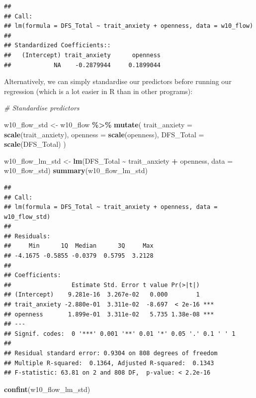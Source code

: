 \documentclass[
]{book}
\newenvironment{Shaded}{\begin{snugshade}}{\end{snugshade}}
\newcommand{\AttributeTok}[1]{\textcolor[rgb]{0.13,0.29,0.53}{#1}}
\newcommand{\CommentTok}[1]{\textcolor[rgb]{0.56,0.35,0.01}{\textit{#1}}}
\newcommand{\FunctionTok}[1]{\textcolor[rgb]{0.13,0.29,0.53}{\textbf{#1}}}
\newcommand{\NormalTok}[1]{#1}
\newcommand{\OtherTok}[1]{\textcolor[rgb]{0.56,0.35,0.01}{#1}}
\newcommand{\SpecialCharTok}[1]{\textcolor[rgb]{0.81,0.36,0.00}{\textbf{#1}}}
\begin{document}
\begin{verbatim}
## 
## Call:
## lm(formula = DFS_Total ~ trait_anxiety + openness, data = w10_flow)
## 
## Standardized Coefficients::
##   (Intercept) trait_anxiety      openness 
##            NA    -0.2879944     0.1899044
\end{verbatim}

Alternatively, we can simply standardise our predictors before running our regression (which is a lot easier in R than in other programs):

\begin{Shaded}
\begin{Highlighting}[]
\CommentTok{\# Standardise predictors}

\NormalTok{w10\_flow\_std }\OtherTok{\textless{}{-}}\NormalTok{ w10\_flow }\SpecialCharTok{\%\textgreater{}\%}
  \FunctionTok{mutate}\NormalTok{(}
    \AttributeTok{trait\_anxiety =} \FunctionTok{scale}\NormalTok{(trait\_anxiety),}
    \AttributeTok{openness =} \FunctionTok{scale}\NormalTok{(openness),}
    \AttributeTok{DFS\_Total =} \FunctionTok{scale}\NormalTok{(DFS\_Total)}
\NormalTok{  )}

\NormalTok{w10\_flow\_lm\_std }\OtherTok{\textless{}{-}} \FunctionTok{lm}\NormalTok{(DFS\_Total }\SpecialCharTok{\textasciitilde{}}\NormalTok{ trait\_anxiety }\SpecialCharTok{+}\NormalTok{ openness, }\AttributeTok{data =}\NormalTok{ w10\_flow\_std)}
\FunctionTok{summary}\NormalTok{(w10\_flow\_lm\_std)}
\end{Highlighting}
\end{Shaded}

\begin{verbatim}
## 
## Call:
## lm(formula = DFS_Total ~ trait_anxiety + openness, data = w10_flow_std)
## 
## Residuals:
##     Min      1Q  Median      3Q     Max 
## -4.1675 -0.5855 -0.0379  0.5795  3.2128 
## 
## Coefficients:
##                 Estimate Std. Error t value Pr(>|t|)    
## (Intercept)    9.281e-16  3.267e-02   0.000        1    
## trait_anxiety -2.880e-01  3.311e-02  -8.697  < 2e-16 ***
## openness       1.899e-01  3.311e-02   5.735 1.38e-08 ***
## ---
## Signif. codes:  0 '***' 0.001 '**' 0.01 '*' 0.05 '.' 0.1 ' ' 1
## 
## Residual standard error: 0.9304 on 808 degrees of freedom
## Multiple R-squared:  0.1364, Adjusted R-squared:  0.1343 
## F-statistic: 63.81 on 2 and 808 DF,  p-value: < 2.2e-16
\end{verbatim}

\begin{Shaded}
\begin{Highlighting}[]
\FunctionTok{confint}\NormalTok{(w10\_flow\_lm\_std)}
\end{Highlighting}
\end{Shaded}
\end{document}
